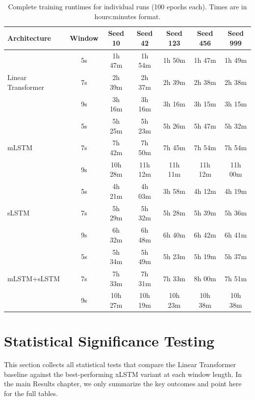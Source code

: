 \begin{table}[htbp]
\centering
\caption{Complete training runtimes for individual runs (100 epochs each). Times are in hours:minutes format.}
\label{tab:app_complete_runtimes}
\footnotesize
\setlength{\tabcolsep}{3pt}
\begin{tabular}{l | c | c | c | c | c | c}
\textbf{Architecture} & \textbf{Window} & \textbf{Seed 10} & \textbf{Seed 42} & \textbf{Seed 123} & \textbf{Seed 456} & \textbf{Seed 999} \\
\hline
\multirow{3}{*}{Linear Transformer} & 5s & 1h 47m & 1h 54m & 1h 50m & 1h 47m & 1h 49m \\
                                    & 7s & 2h 39m & 2h 37m & 2h 39m & 2h 38m & 2h 38m \\
                                    & 9s & 3h 16m & 3h 16m & 3h 16m & 3h 15m & 3h 15m \\
\hline
\multirow{3}{*}{\ac{mLSTM}} & 5s & 5h 25m & 5h 23m & 5h 26m & 5h 47m & 5h 32m \\
                           & 7s & 7h 42m & 7h 50m & 7h 45m & 7h 54m & 7h 54m \\
                           & 9s & 10h 28m & 11h 12m & 11h 11m & 11h 12m & 11h 00m \\
\hline
\multirow{3}{*}{\ac{sLSTM}} & 5s & 4h 21m & 4h 03m & 3h 58m & 4h 12m & 4h 19m \\
                           & 7s & 5h 29m & 5h 32m & 5h 28m & 5h 39m & 5h 36m \\
                           & 9s & 6h 32m & 6h 48m & 6h 40m & 6h 42m & 6h 41m \\
\hline
\multirow{3}{*}{\ac{mLSTM}+\ac{sLSTM}} & 5s & 5h 34m & 5h 49m & 5h 23m & 5h 19m & 5h 37m \\
                                      & 7s & 7h 33m & 7h 31m & 7h 33m & 8h 00m & 7h 51m \\
                                      & 9s & 10h 27m & 10h 19m & 10h 23m & 10h 38m & 10h 38m \\
\hline
\end{tabular}
\setlength{\tabcolsep}{6pt}
\end{table}

\section{Statistical Significance Testing}
\label{app:statistical_significance_testing}

This section collects all statistical tests that compare the Linear Transformer baseline against the best-performing \ac{xLSTM} variant at each window length. In the main Results chapter, we only summarize the key outcomes and point here for the full tables.

